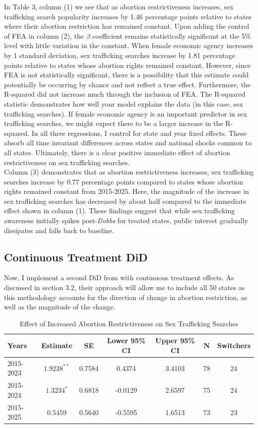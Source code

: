 \documentclass[10pt]{article}
\begin{document}
\indent In Table 3, column (1) we see that as abortion restrictiveness increases, sex trafficking search popularity increases by 1.46 percentage points relative to states where their abortion restriction has remained constant. Upon adding the control of FEA in column (2), the $\beta$ coefficient remains statistically significant at the 5\% level with little variation in the constant. When female economic agency increases by 1 standard deviation, sex trafficking searches increase by 1.81 percentage points relative to states whose abortion rights remained constant. However, since FEA is not statistically significant, there is a possibility that this estimate could potentially be occurring by chance and not reflect a true effect. Furthermore, the R-squared did not increase much through the inclusion of FEA. The R-squared statistic demonstrates how well your model explains the data (in this case, sex trafficking searches). If female economic agency is an important predictor in sex trafficking searches, we might expect there to be a larger increase in the R-squared. In all three regressions, I control for state and year fixed effects. These absorb all time invariant differences across states and national shocks common to all states. Ultimately, there is a clear positive immediate effect of abortion restrictiveness  on sex trafficking searches. \\
\indent Column (3) demonstrates that as abortion restrictiveness increases, sex trafficking searches increase by 0.77 percentage points compared to states whose abortion rights remained constant from 2015-2025. Here, the magnitude of the increase in sex trafficking searches has decreased by about half compared to the immediate effect shown in column (1). These findings suggest that while sex trafficking awareness initially spikes post-\textit{Dobbs} for treated states, public interest gradually dissipates and falls back to baseline. 

\subsection{Continuous Treatment DiD}
Now, I implement a second DiD from \cite{diff2} with continuous treatment effects. As discussed in section 3.2, their approach will allow me to include all 50 states as this methodology accounts for the direction of change in abortion restriction, as well as the magnitude of the change. 

\begin{table}[H]
\centering

\begin{tabular}{lcccccc}
\toprule
Years & Estimate & SE & Lower 95\% CI & Upper 95\% CI & N & Switchers \\
\midrule
2015-2023 & $1.9238^{**}$ & 0.7584 & 0.4374 & 3.4103 & 78 & 24 \\
2015-2024 & $1.3234^{*}$ & 0.6818 & -0.0129 & 2.6597 & 75 & 24 \\
2015-2025 & 0.5459 & 0.5640 & -0.5595 & 1.6513 & 73 & 23 \\
\bottomrule
\end{tabular}
\caption{Effect of Increased Abortion Restrictiveness on Sex Trafficking Searches}
\end{table}
\end{document}

